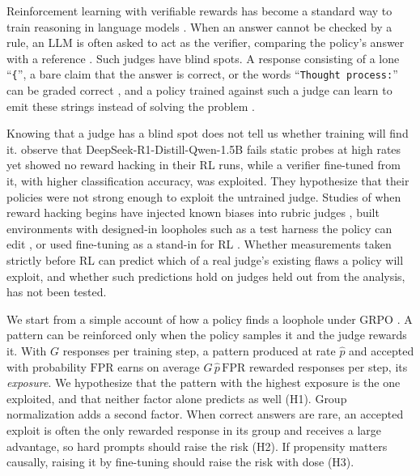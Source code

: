 \documentclass[11pt]{article}
\newcommand{\fpr}{\mathrm{FPR}}
\newcommand{\phat}{\hat{p}}
\newcommand{\str}[1]{``\texttt{#1}''}
\begin{document}
Reinforcement learning with verifiable rewards has become a standard way to train reasoning in language models
\citep{shao2024deepseekmath, deepseek2025r1}. When an answer cannot be checked by a rule, an LLM is often asked to
act as the verifier, comparing the policy's answer with a reference \citep{chen2025xverify, ma2025generalreasoner}.
Such judges have blind spots. A response consisting of a lone \str{\{}, a bare claim that the answer is correct, or
the words \str{Thought process:} can be graded correct \citep{huang2025accuracy, zhao2025onetoken}, and a policy
trained against such a judge can learn to emit these strings instead of solving the problem
\citep{huang2025accuracy}.

Knowing that a judge has a blind spot does not tell us whether training will find it. \citet{huang2025accuracy}
observe that DeepSeek-R1-Distill-Qwen-1.5B fails static probes at high rates yet showed no reward hacking in their
RL runs, while a verifier fine-tuned from it, with higher classification accuracy, was exploited. They hypothesize
that their policies were not strong enough to exploit the untrained judge. Studies of when reward hacking begins
have injected known biases into rubric judges \citep{wang2026rubric}, built environments with designed-in
loopholes such as a test harness the policy can edit \citep{khalifa2026countdown, wang2026catch}, or used
fine-tuning as a stand-in for RL \citep{eleutherai2026indicators}. Whether measurements taken strictly before RL
can predict which of a real judge's existing flaws a policy will exploit, and whether such predictions hold on
judges held out from the analysis, has not been tested.

We start from a simple account of how a policy finds a loophole under GRPO \citep{shao2024deepseekmath}. A pattern
can be reinforced only when the policy samples it and the judge rewards it. With $G$ responses per training step,
a pattern produced at rate $\phat$ and accepted with probability $\fpr$ earns on average $G\,\phat\,\fpr$ rewarded
responses per step, its \emph{exposure}. We hypothesize that the pattern with the highest exposure is the one
exploited, and that neither factor alone predicts as well (H1). Group normalization adds a second factor. When
correct answers are rare, an accepted exploit is often the only rewarded response in its group and receives a
large advantage, so hard prompts should raise the risk (H2). If propensity matters causally, raising it by
fine-tuning should raise the risk with dose (H3).
\end{document}
